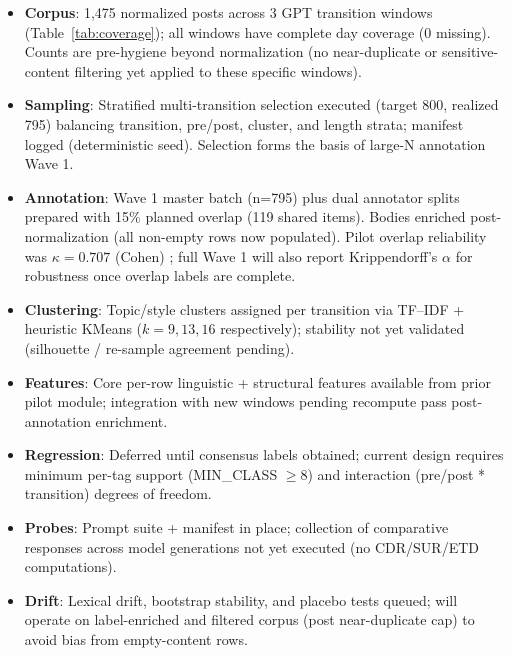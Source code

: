 \documentclass{article}
\begin{document}
\begin{itemize}
  \item \textbf{Corpus}: 1,475 normalized posts across 3 GPT transition windows (Table~\ref{tab:coverage}); all windows have complete day coverage (0 missing). Counts are pre-hygiene beyond normalization (no near-duplicate or sensitive-content filtering yet applied to these specific windows).
  \item \textbf{Sampling}: Stratified multi-transition selection executed (target 800, realized 795) balancing transition, pre/post, cluster, and length strata; manifest logged (deterministic seed). Selection forms the basis of large-N annotation Wave 1.
  \item \textbf{Annotation}: Wave 1 master batch (n=795) plus dual annotator splits prepared with 15\% planned overlap (119 shared items). Bodies enriched post-normalization (all non-empty rows now populated). Pilot overlap reliability was $\kappa=0.707$ (Cohen) \citep{landis1977measurement}; full Wave 1 will also report Krippendorff's $\alpha$ for robustness \citep{artstein2008agreement, krippendorff2013content} once overlap labels are complete.
  \item \textbf{Clustering}: Topic/style clusters assigned per transition via TF--IDF + heuristic KMeans ($k=9,13,16$ respectively); stability not yet validated (silhouette / re-sample agreement pending).
  \item \textbf{Features}: Core per-row linguistic + structural features available from prior pilot module; integration with new windows pending recompute pass post-annotation enrichment.
  \item \textbf{Regression}: Deferred until consensus labels obtained; current design requires minimum per-tag support (MIN\_CLASS $\geq 8$) and interaction (pre/post * transition) degrees of freedom.
  \item \textbf{Probes}: Prompt suite + manifest in place; collection of comparative responses across model generations not yet executed (no CDR/SUR/ETD computations).
  \item \textbf{Drift}: Lexical drift, bootstrap stability, and placebo tests queued; will operate on label-enriched and filtered corpus (post near-duplicate cap) to avoid bias from empty-content rows.
\end{itemize}
\end{document}
